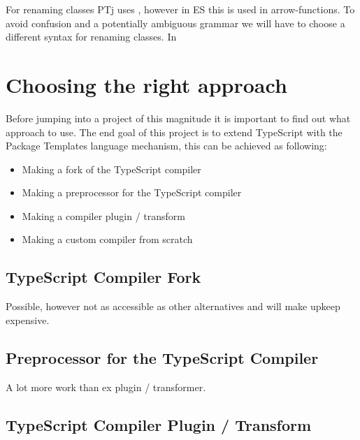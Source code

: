 For renaming classes PTj uses \codeword{=>}, however in ES this is used in arrow-functions\cite{arrowfunction}.
To avoid confusion and a potentially ambiguous grammar we will have to choose a different syntax for renaming classes.
In 



\section{Choosing the right approach}\label{sec:choosing-the-right-approach}

Before jumping into a project of this magnitude it is important to find out what approach to use. 
The end goal of this project is to extend TypeScript with the Package Templates language mechanism,
this can be achieved as following:

\begin{itemize}
    \item Making a fork of the TypeScript compiler
    \item Making a preprocessor for the TypeScript compiler
    \item Making a compiler plugin / transform
    \item Making a custom compiler from scratch
\end{itemize}

\subsection{TypeScript Compiler Fork}\label{subsec:typescript-compiler-fork}

Possible, however not as accessible as other alternatives and will make upkeep expensive.

\subsection{Preprocessor for the TypeScript Compiler}\label{subsec:preprocessor-for-the-typescript-compiler}

A lot more work than ex plugin / transformer.

\subsection{TypeScript Compiler Plugin / Transform}\label{subsec:typescript-compiler-plugin}


